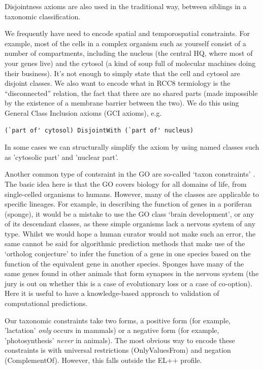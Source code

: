 \documentclass{llncs}
\begin{document}
Disjointness axioms are also used in the traditional way, between
siblings in a taxonomic classification.

We frequently have need to encode spatial and temporospatial
constraints. For example, most of the cells in a complex organism such
as yourself consist of a number of compartments, including the nucleus
(the central HQ, where most of your genes live) and the cytosol (a
kind of soup full of molecular machines doing their business). It’s
not enough to simply state that the cell and cytosol are disjoint
classes. We also want to encode what in RCC8 termiology is the
``disconnected'' relation, the fact that there are no shared parts
(made impossible by the existence of a membrane barrier between the
two). We do this using General Class Inclusion axioms (GCI axioms),
e.g.  

\begin{verbatim}
(`part of' cytosol) DisjointWith (`part of' nucleus)
\end{verbatim}

In some cases we can structurally simplify the axiom by using named
classes such as 'cytosolic part' and 'nuclear part'.

Another common type of contsraint in the GO are so-called `taxon
constraints' \cite{Deegan2010}. The basic idea here is that the GO
covers biology for all domains of life, from single-celled organisms
to humans. However, many of the classes are applicable to specific
lineages. For example, in describing the function of genes in a
poriferan (sponge), it would be a mistake to use the GO class ‘brain
development’, or any of its descendant classes, as these simple
organisms lack a nervous system of any type. Whilst we would hope a
human curator would not make such an error, the same cannot be said
for algorithmic prediction methods that make use of the `ortholog
conjecture'\cite{Thomas2012} to infer the function of a gene in one
species based on the function of the equivalent gene in another
species. Sponges have many of the same genes found in other animals
that form synapses in the nervous system (the jury is out on whether
this is a case of evolutionary loss or a case of co-option). Here it
is useful to have a knowledge-based approach to validation of
computational predictions.

Our taxonomic constraints take two forms, a positive form (for
example, 'lactation' \emph{only} occurs in mammals) or a negative form
(for example, 'photosynthesis' \emph{never} in animals). The most
obvious way to encode these constraints is with universal restrictions
(OnlyValuesFrom) and negation (ComplementOf). However, this falls
outside the EL++ profile.
\end{document}
